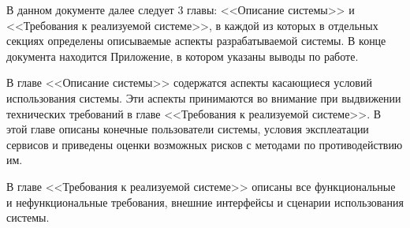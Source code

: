 В данном документе далее следует 3 главы: <<Описание системы>> и <<Требования к реализуемой системе>>, в каждой из которых в отдельных секциях определены описываемые аспекты разрабатываемой системы. В конце документа находится Приложение, в котором указаны выводы по работе.

В главе <<Описание системы>> содержатся аспекты касающиеся условий использования системы. Эти аспекты принимаются во внимание при выдвижении технических требований в главе <<Требования к реализуемой системе>>. В этой главе описаны конечные пользователи системы, условия эксплеатации сервисов и приведены оценки возможных рисков с методами по противодействию им.

В главе <<Требования к реализуемой системе>> описаны все функциональные и нефункциональные требования, внешние интерфейсы и сценарии использования системы. 






